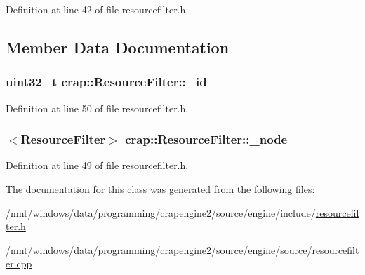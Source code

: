 Definition at line 42 of file resourcefilter.\+h.



\subsection{Member Data Documentation}
\hypertarget{classcrap_1_1_resource_filter_a6991e27ddd701e769e6218fe34c333a6}{}
\subsubsection[{\+\_\+id}]{\setlength{\rightskip}{0pt plus 5cm}uint32\+\_\+t crap\+::\+Resource\+Filter\+::\+\_\+id\hspace{0.3cm}{\ttfamily [protected]}}\label{classcrap_1_1_resource_filter_a6991e27ddd701e769e6218fe34c333a6}


Definition at line 50 of file resourcefilter.\+h.

\hypertarget{classcrap_1_1_resource_filter_ae5724fd4f42bcd4ebe9e84ac1c9caf1c}{}
\subsubsection[{\+\_\+node}]{$<${\bf Resource\+Filter}$>$ crap\+::\+Resource\+Filter\+::\+\_\+node\hspace{0.3cm}{\ttfamily [protected]}}\label{classcrap_1_1_resource_filter_ae5724fd4f42bcd4ebe9e84ac1c9caf1c}


Definition at line 49 of file resourcefilter.\+h.



The documentation for this class was generated from the following files\+:\begin{DoxyCompactItemize}
\item 
/mnt/windows/data/programming/crapengine2/source/engine/include/\hyperlink{resourcefilter_8h}{resourcefilter.\+h}\item 
/mnt/windows/data/programming/crapengine2/source/engine/source/\hyperlink{resourcefilter_8cpp}{resourcefilter.\+cpp}\end{DoxyCompactItemize}
